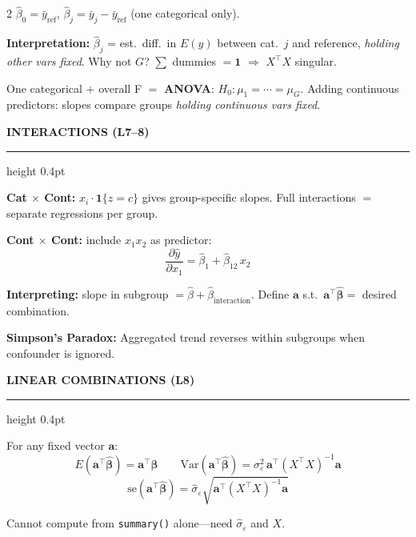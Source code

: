 \documentclass[7pt]{extarticle}
\newcommand{\msection}[1]{%
  \vspace{4pt}%
  {\small\bfseries\color{blue!70!black}\MakeUppercase{#1}}%
  \vspace{1pt}%
  \par\nobreak%
  {\color{blue!70!black}\hrule height 0.4pt}%
  \vspace{2pt}\par\nobreak%
}
\newcommand{\bhat}{\hat{\bm{\beta}}}
\newcommand{\bvec}{\bm{\beta}}
\newcommand{\sighat}{\hat{\sigma}_\varepsilon}
\newcommand{\sigeps}{\sigma_\varepsilon}
\newcommand{\XtX}{X^\top X}
\begin{document}
\begin{multicols}{2}
$\hat\beta_0 = \bar{y}_{\text{ref}}$, \;\; $\hat\beta_j = \bar{y}_j - \bar{y}_{\text{ref}}$ \;\; (one categorical only).

\textbf{Interpretation:} $\hat\beta_j$ = est.\ diff.\ in $E(y)$ between cat.\ $j$ and reference, \emph{holding other vars fixed}. Why not $G$? $\sum$ dummies $= \bm{1}$ $\Rightarrow$ $\XtX$ singular.

One categorical $+$ overall F $=$ \textbf{ANOVA}: $H_0\!: \mu_1{=}\cdots{=}\mu_G$. Adding continuous predictors: slopes compare groups \emph{holding continuous vars fixed}.

\msection{Interactions (L7--8)}

\textbf{Cat $\times$ Cont:} $x_i \cdot \mathbf{1}\{z{=}c\}$ gives group-specific slopes. Full interactions $=$ separate regressions per group.

\textbf{Cont $\times$ Cont:} include $x_1 x_2$ as predictor:
\[
\frac{\partial\hat{y}}{\partial x_1} = \hat\beta_1 + \hat\beta_{12}\,x_2
\]

\textbf{Interpreting:} slope in subgroup $= \hat\beta + \hat\beta_{\text{interaction}}$. Define $\bm{a}$ s.t.\ $\bm{a}^\top\bhat =$ desired combination.

\textbf{Simpson's Paradox:} Aggregated trend reverses within subgroups when confounder is ignored.

\msection{Linear Combinations (L8)}

For any fixed vector $\bm{a}$:
\[
E(\bm{a}^\top\bhat) = \bm{a}^\top\bvec \qquad \text{Var}(\bm{a}^\top\bhat) = \sigeps^2\,\bm{a}^\top(\XtX)^{-1}\bm{a}
\]
\[
\text{se}(\bm{a}^\top\bhat) = \sighat\sqrt{\bm{a}^\top(\XtX)^{-1}\bm{a}}
\]

Cannot compute from \texttt{summary()} alone---need $\sighat$ and $X$.

\end{multicols}

\newpage
\end{document}
